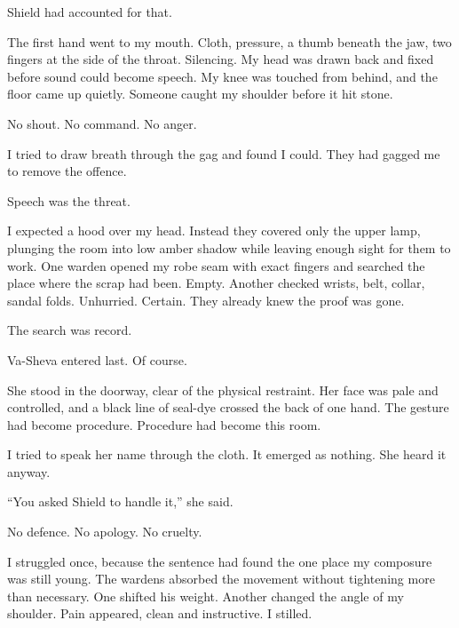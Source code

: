 Shield had accounted for that.\par

The first hand went to my mouth. Cloth, pressure, a thumb beneath the jaw, two fingers at the side of the throat. Silencing. My head was drawn back and fixed before sound could become speech. My knee was touched from behind, and the floor came up quietly. Someone caught my shoulder before it hit stone.\par

No shout. No command. No anger.\par

I tried to draw breath through the gag and found I could. They had gagged me to remove the offence.\par

Speech was the threat.\par

I expected a hood over my head. Instead they covered only the upper lamp, plunging the room into low amber shadow while leaving enough sight for them to work. One warden opened my robe seam with exact fingers and searched the place where the scrap had been. Empty. Another checked wrists, belt, collar, sandal folds. Unhurried. Certain. They already knew the proof was gone.\par

The search was record.\par

Va-Sheva entered last. Of course.\par

She stood in the doorway, clear of the physical restraint. Her face was pale and controlled, and a black line of seal-dye crossed the back of one hand. The gesture had become procedure. Procedure had become this room.\par

I tried to speak her name through the cloth. It emerged as nothing. She heard it anyway.\par

``You asked Shield to handle it,'' she said.\par

No defence. No apology. No cruelty.\par

I struggled once, because the sentence had found the one place my composure was still young. The wardens absorbed the movement without tightening more than necessary. One shifted his weight. Another changed the angle of my shoulder. Pain appeared, clean and instructive. I stilled.\par

